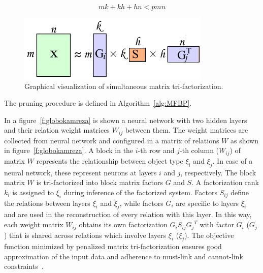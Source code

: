 \documentclass{article} %
\begin{document}
\begin{equation} \label{eq:1}
 mk + kh + hn < pmn
\end{equation}



\begin{figure}[!ht]
\centering 
\includegraphics[width=.5\textwidth]{mf2.png}
\caption{Graphical visualization of simultaneous matrix tri-factorization.}
\label{f:mf2}
\end{figure}


\newpage

The pruning procedure is defined in Algorithm~\ref{alg:MFBP}.


In a figure~\ref{f:globokamreza} is shown a neural network with two hidden
layers and their relation weight matrices $W_{ij}$ between them. The weight
matrices are collected from neural network and configured in a matrix of
relations $W$ as shown in figure~\ref{f:globokamreza}. A block in the $i$-th
row and $j$-th column ($W_{ij}$) of matrix $W$ represents the relationship
between object type $\xi_i$ and $\xi_j$. In case of a neural network, these
represent neurons at layers $i$ and $j$, respectively. The block matrix $W$ is
tri-factorized into block matrix factors $G$ and $S$. A factorization rank
$k_i$ is assigned to $\xi_i$ during inference of the factorized system. Factors
$S_{ij}$ define the relations between layers $\xi_i$ and $\xi_j$, while
factors $G_i$ are specific to layers $\xi_i$ and are used in the
reconstruction of every relation with this layer. In this way, each
weight matrix $W_{ij}$ obtains its own factorization $G_i S_{ij} {G_j}^T$ with
factor $G_i$ ($G_j$) that is shared across relations which involve layers
$\xi_i$ ($\xi_j$). The objective function minimized by penalized matrix
tri-factorization ensures good approximation of the input data and adherence to
must-link and cannot-link constraints~\cite{zitnik2015data}.

\end{document}
